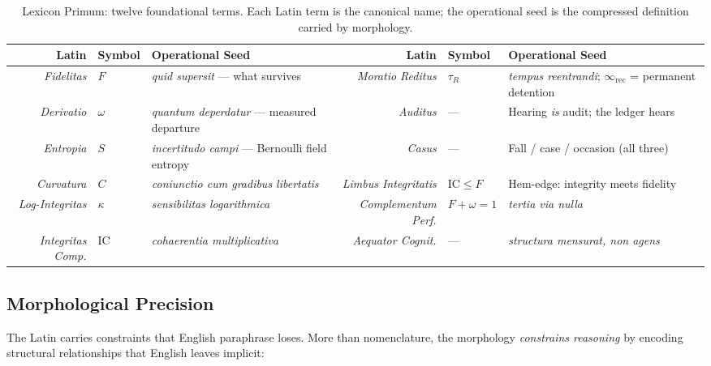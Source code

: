 \documentclass[
  aps,
  prd,
  twocolumn,
  superscriptaddress,
  nofootinbib,
  floatfix
]{revtex4-2}
\newcommand{\tR}{\tau_{\!R}}
\newcommand{\IR}{\infty_{\mathrm{rec}}}
\newcommand{\Fid}{F}
\newcommand{\Drft}{\omega}
\newcommand{\Ent}{S}
\newcommand{\Curv}{C}
\newcommand{\Logint}{\kappa}
\newcommand{\IC}{\mathrm{IC}}
\newcommand{\lat}[1]{\textit{#1}}
\begin{document}
\begin{table}[htbp]
\centering
\small
\caption{Lexicon Primum: twelve foundational terms. Each
  Latin term is the canonical name; the operational seed is
  the compressed definition carried by morphology.}
\label{tab:lexicon}
\begin{tabular}{@{}rlP{4.7cm}rlP{4.7cm}@{}}
\toprule
\textbf{Latin} & \textbf{Symbol} & \textbf{Operational Seed} &
\textbf{Latin} & \textbf{Symbol} & \textbf{Operational Seed} \\
\midrule
\lat{Fidelitas}  & $\Fid$ &
  \lat{quid supersit} --- what survives &
\lat{Moratio Reditus}  & $\tR$ &
  \lat{tempus reentrandi}; $\IR$ = permanent detention \\[3pt]
\lat{Derivatio}  & $\Drft$ &
  \lat{quantum deperdatur} --- measured departure &
\lat{Auditus}  & --- &
  Hearing \emph{is} audit; the ledger hears \\[3pt]
\lat{Entropia}  & $\Ent$ &
  \lat{incertitudo campi} --- Bernoulli field entropy &
\lat{Casus}  & --- &
  Fall / case / occasion (all three) \\[3pt]
\lat{Curvatura}  & $\Curv$ &
  \lat{coniunctio cum gradibus libertatis} &
\lat{Limbus Integritatis}  & $\IC \leq \Fid$ &
  Hem-edge: integrity meets fidelity \\[3pt]
\lat{Log-Integritas}  & $\Logint$ &
  \lat{sensibilitas logarithmica} &
\lat{Complementum Perf.} & $\Fid{+}\Drft{=}1$ &
  \lat{tertia via nulla} \\[3pt]
\lat{Integritas Comp.}  & $\IC$ &
  \lat{cohaerentia multiplicativa} &
\lat{Aequator Cognit.}  & --- &
  \lat{structura mensurat, non agens} \\
\bottomrule
\end{tabular}
\end{table}

\subsection{Morphological Precision}
\FloatBarrier

The Latin carries constraints that English paraphrase loses.
More than nomenclature, the morphology \emph{constrains reasoning}
by encoding structural relationships that English leaves
implicit:
\end{document}
